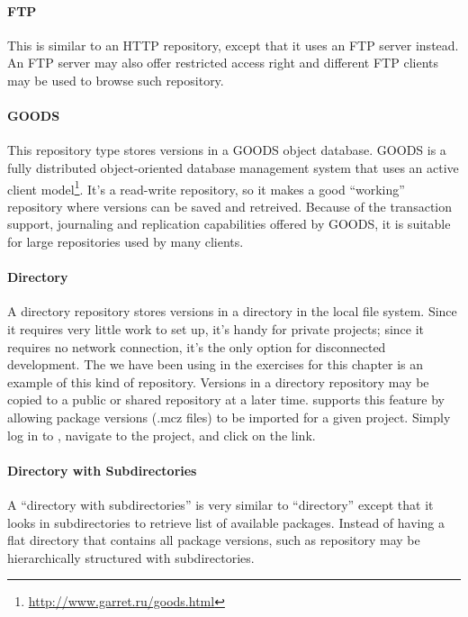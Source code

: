 \documentclass[a4paper,10pt,twoside]{book}
\begin{document}
\paragraph{FTP} This is similar to an HTTP repository, except that it uses an FTP server instead. An FTP server may also offer restricted access right and different FTP clients may be used to browse such \MC repository.

\paragraph{GOODS}
This repository type stores versions in a GOODS object database.
GOODS is a fully distributed object-oriented database management system that uses an active client model\footnote{\url{http://www.garret.ru/goods.html}}.
It's a read-write repository, so it makes a good ``working'' repository where versions can be saved and retreived. Because of the transaction support, journaling and replication capabilities offered by GOODS, it is suitable for large repositories used by many clients.  

\paragraph{Directory} A directory repository stores versions in a directory in the local file system. Since it requires very little work to set up, it's handy for private projects; since it requires no network connection, it's the only option for disconnected development. The  we have been using in the exercises for this chapter is an example of this kind of repository. Versions in a directory repository may be copied to a public or shared repository at a later time. \sqsrc supports this feature by allowing package versions (.mcz files) to be imported for a given project. Simply log in to \sqsrc, navigate to the project, and click on the  link.

\paragraph{Directory with Subdirectories}  A ``directory with subdirectories'' is very similar to ``directory'' except that it looks in subdirectories to retrieve list of available packages. Instead of having a flat directory that contains all package versions, such as repository may be hierarchically  structured with  subdirectories.
\end{document}
